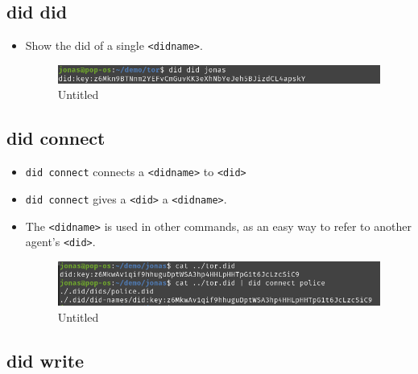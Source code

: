 \hypertarget{did-did}{%
\subsection{\texorpdfstring{did did }{did did }}\label{did-did}}

\begin{itemize}
\item
  Show the did of a single \passthrough{\lstinline!<didname>!}.

  \begin{figure}
  \centering
  \includegraphics{User Interface f8759a9462b24d5f95cf6123d68b89ea/Untitled 4.png}
  \caption{Untitled}
  \end{figure}
\end{itemize}

\hypertarget{did-connect}{%
\subsection{\texorpdfstring{did connect
}{did connect  }}\label{did-connect}}

\begin{itemize}
\item
  \passthrough{\lstinline!did connect!} connects a
  \passthrough{\lstinline!<didname>!} to \passthrough{\lstinline!<did>!}
\item
  \passthrough{\lstinline!did connect!} gives a
  \passthrough{\lstinline!<did>!} a \passthrough{\lstinline!<didname>!}.
\item
  The \passthrough{\lstinline!<didname>!} is used in other commands, as
  an easy way to refer to another agent's
  \passthrough{\lstinline!<did>!}.

  \begin{figure}
  \centering
  \includegraphics{User Interface f8759a9462b24d5f95cf6123d68b89ea/Untitled 5.png}
  \caption{Untitled}
  \end{figure}
\end{itemize}

\hypertarget{did-write}{%
\subsection{\texorpdfstring{did write }{did write  }}\label{did-write}}

